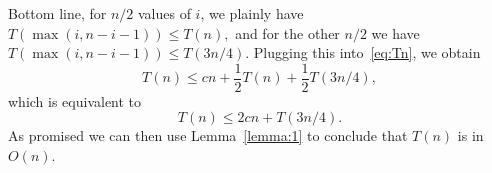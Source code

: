 \documentclass{report}
\begin{document}
Bottom line, for $n/2$ values of $i$, we plainly have 
$T(\max(i,n-i-1)) \le T(n),$ and for the other $n/2$ we 
have $T(\max(i,n-i-1)) \le T(3n/4).$ Plugging this 
into~\eqref{eq:Tn}, we obtain
$$T(n) \le cn+ \frac 12 T(n) + \frac 12 T(3n/4),$$
which is equivalent to
$$T(n) \le 2cn + T(3n/4).$$
As promised we can then use Lemma~\ref{lemma:1} to conclude
that $T(n)$ is in $O(n)$.


\end{document}
